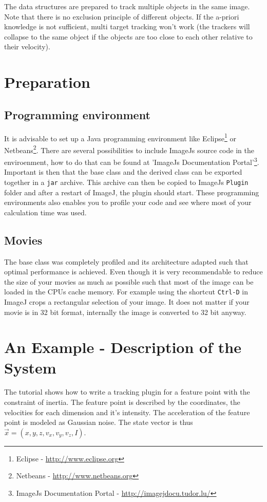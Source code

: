 \documentclass{scrartcl}
\begin{document}
The data structures are prepared to track multiple objects in the same image. Note that there is no exclusion principle of different objects. If the a-priori knowledge is not sufficient, multi target tracking won't work (the trackers will collapse to the same object if the objects are too close to each other relative to their velocity).

\section{Preparation}
\subsection{Programming environment}
It is advisable to set up a Java programming environment like Eclipse\footnote{Eclipse - \href{http://www.eclipse.org}{http://www.eclipse.org}} or Netbeans\footnote{Netbeans - \href{http://www.netbeans.org}{http://www.netbeans.org}}. There are several possibilities to include ImageJs source code in the enviroenment, how to do that can be found at 'ImageJs Documentation Portal'\footnote{ImageJs Documentation Portal - \href{http://imagejdocu.tudor.lu/}{http://imagejdocu.tudor.lu/}}. Important is then that the base class and the derived class can be exported together in a \texttt{jar} archive. This archive can then be copied to ImageJs \texttt{Plugin} folder and after a restart of ImageJ, the plugin should start. These programming environments also enables you to profile your code and see where most of your calculation time was used. 

\subsection{Movies}
The base class was completely profiled and its architecture adapted such that optimal performance is achieved. Even though it is very recommendable to reduce the size of your movies as much as possible such that most of the image can be loaded in the CPUs cache memory. For example using the shortcut \texttt{Ctrl-D} in ImageJ crops a rectangular selection of your image. It does not matter if your movie is in 32 bit format, internally the image is converted to 32 bit anyway.

\section{An Example - Description of the System}
\label{sec:descriptionofthesystem}
The tutorial shows how to write a tracking plugin for a feature point with the constraint of inertia. The feature point is described by the coordinates, the velocities for each dimension and it's intensity. The acceleration of the feature point is modeled as Gaussian noise. The state vector is thus $\vec{x} = \left(x,y,z,v_x,v_y,v_z,I\right)$. 
\end{document}

